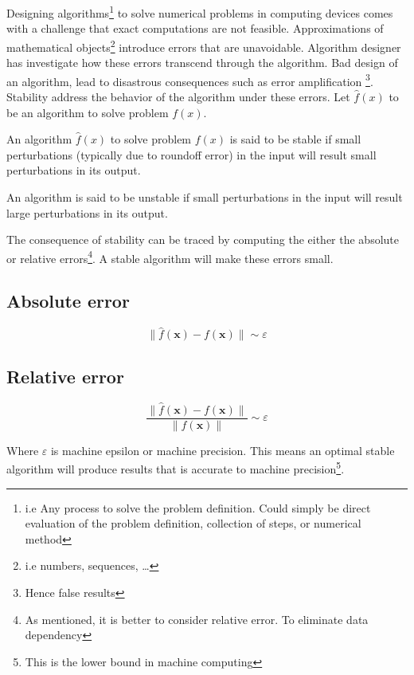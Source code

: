 \documentclass[../main.tex]{subfiles}
\begin{document}
	
	\par Designing algorithms\footnote{i.e Any process to solve the problem definition. Could simply be direct evaluation of the problem definition, collection of steps, or numerical method} to solve numerical problems in computing devices comes with a challenge that exact computations are not feasible. Approximations of mathematical objects\footnote{i.e numbers, sequences, \dots} introduce errors that are unavoidable. Algorithm designer has investigate how these errors transcend through the algorithm. Bad design of an algorithm, lead to disastrous consequences such as error amplification \footnote{Hence false results}. Stability address the behavior of the algorithm under these errors. Let $\hat{f}(x)$ to be an algorithm to solve problem $f(x)$.
		\begin{definition}
			An algorithm $\hat{f}(x)$ to solve problem $f(x)$ is said to be stable if small perturbations (typically due to roundoff error) in the input will result small perturbations in its output.
		\end{definition}
		
		\begin{definition}
			An algorithm is said to be unstable if small perturbations in the input will result large perturbations in its output.
		\end{definition}
		
		\par The consequence of stability can be traced by computing the either the absolute or relative errors\footnote{As mentioned, it is better to consider relative error. To eliminate data dependency}. A stable algorithm will make these errors small.
		\subsection{Absolute error}
			\begin{equation*}					
				\| \hat{f}(\mathbf{x}) - f(\mathbf{x}) \| \sim \varepsilon
			\end{equation*}
			
		\subsection{Relative error}
			\begin{equation*}
				\frac{\| \hat{f}(\mathbf{x}) - f(\mathbf{x}) \|}{\| f(\mathbf{x}) \|} \sim \varepsilon
			\end{equation*}
	
		\par Where $\varepsilon$ is machine epsilon or machine precision. This means an optimal stable algorithm will produce results that is accurate to machine precision\footnote{This is the lower bound in machine computing}.
	
\end{document}
